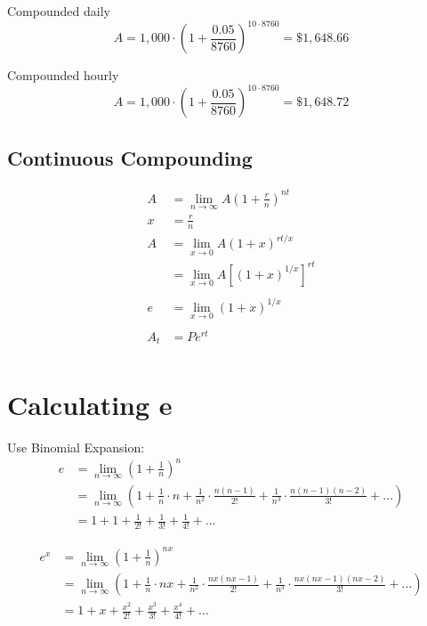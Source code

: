 \documentclass[letterpaper, portrait]{exam}
\begin{document}
  Compounded daily
  \[
    A = 1,000 \cdot \left( 1 + \frac{0.05}{8760} \right)^{10 \cdot 8760} = \$1,648.66
  \]

  Compounded hourly
  \[
    A = 1,000 \cdot \left( 1 + \frac{0.05}{8760} \right)^{10 \cdot 8760} = \$1,648.72
  \]

  \subsection{Continuous Compounding} %
  
  \begin{align*}
    A   & = \lim_{n \to \infty} A \left( 1 + \frac{r}{n} \right)^{nt}
    \\
    x   & = \frac{r}{n} \
    \\
    A   & = \lim_{x \to 0} A \left( 1 + x \right)^{rt/x} \\
        & = \lim_{x \to 0} A \left[ \left( 1 + x \right)^{1/x} \right]^{rt} \\
    \\
    e   & = \lim_{x \to 0} \left( 1 + x \right)^{1/x} \\
    \\
    A_t & = P e^{rt} \\
  \end{align*}

  \section{Calculating e} %
  

  Use Binomial Expansion:
  \begin{align*}
    e &= \lim_{n \to \infty} \left( 1 + \frac{1}{n} \right)^n \\
      & = \lim_{n \to \infty} \left( 1 + \frac{1}{n} \cdot n + \frac{1}{n^2} \cdot \frac{n(n - 1)}{2!} 
        + \frac{1}{n^3} \cdot \frac{n(n - 1)(n - 2)}{3!} + \ldots \right) \\
      & = 1 + 1 + \frac{1}{2!} + \frac{1}{3!} + \frac{1}{4!} + \ldots
  \end{align*}

  \begin{align*}
    e^x &= \lim_{n \to \infty} \left( 1 + \frac{1}{n} \right)^{nx} \\
      & = \lim_{n \to \infty} \left( 1 + \frac{1}{n} \cdot nx + \frac{1}{n^2} \cdot \frac{nx(nx - 1)}{2!} 
        + \frac{1}{n^3} \cdot \frac{nx(nx - 1)(nx - 2)}{3!} + \ldots \right) \\
      & = 1 + x + \frac{x^2}{2!} + \frac{x^3}{3!} + \frac{x^4}{4!} + \ldots
  \end{align*}
\end{document}
